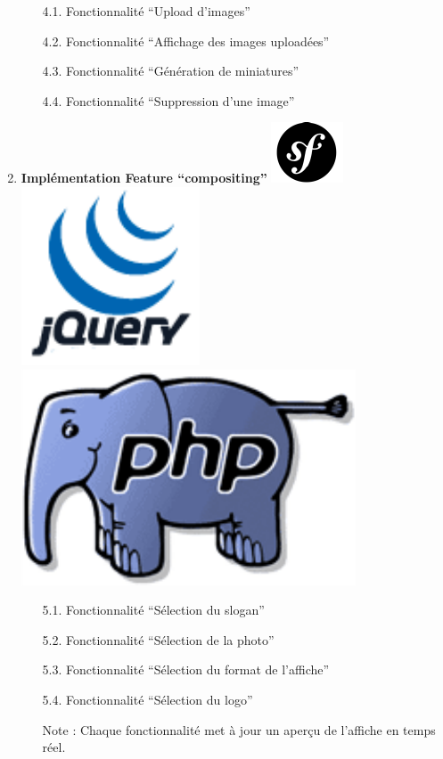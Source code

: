 \documentclass{article}
\begin{document}
\begin{sffamily}
\begin{enumerate}
	\begin{enumerate}
		\item[4.1.] Fonctionnalité ``Upload d'images''
		\item[4.2.] Fonctionnalité ``Affichage des images uploadées''
		\item[4.3.] Fonctionnalité ``Génération de miniatures''
		\item[4.4.] Fonctionnalité ``Suppression d'une image''
	\end{enumerate}
\item \textbf{Implémentation Feature \textbf{``compositing''}} \includegraphics[scale=0.5]{symfony.pdf}\includegraphics[scale=0.2]{jquery.pdf}\includegraphics[scale=0.15]{php.pdf}
	\begin{enumerate}
		\item[5.1.] Fonctionnalité ``Sélection du slogan''
		\item[5.2.] Fonctionnalité ``Sélection de la photo''
		\item[5.3.] Fonctionnalité ``Sélection du format de l'affiche''
		\item[5.4.] Fonctionnalité ``Sélection du logo''
		\item[] Note : Chaque fonctionnalité met à jour un aperçu de l'affiche en temps réel.

\end{enumerate}
\end{enumerate}
\end{sffamily}
\end{document}
